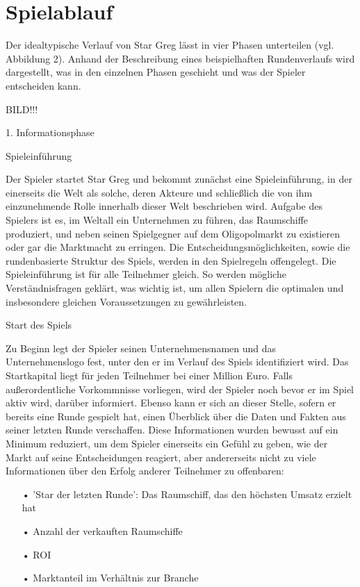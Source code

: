 \section{Spielablauf}
\label{sec:spielwelt-regeln}

Der idealtypische Verlauf von Star Greg lässt in vier Phasen unterteilen (vgl. Abbildung 2). Anhand der Beschreibung eines beispielhaften Rundenverlaufs wird dargestellt, was in den einzelnen Phasen geschieht und was der Spieler entscheiden kann.



BILD!!!



{\Large 1. Informationsphase}


{\large Spieleinführung}

Der Spieler startet Star Greg und bekommt zunächst eine Spieleinführung, in der einerseits die Welt als solche, deren Akteure und schließlich die von ihm einzunehmende Rolle innerhalb dieser Welt beschrieben wird. Aufgabe des Spielers ist es, im Weltall ein Unternehmen zu führen, das Raumschiffe produziert, und neben seinen Spielgegner auf dem Oligopolmarkt zu existieren oder gar die Marktmacht zu erringen. Die Entscheidungsmöglichkeiten, sowie die rundenbasierte Struktur des Spiels, werden in den Spielregeln offengelegt. Die Spieleinführung ist für alle Teilnehmer gleich. So werden mögliche Verständnisfragen geklärt, was wichtig ist, um allen Spielern die optimalen und insbesondere gleichen Voraussetzungen zu gewährleisten. 


{\large Start des Spiels}

Zu Beginn legt der Spieler seinen Unternehmensnamen und das Unternehmenslogo fest, unter den er im Verlauf des Spiels identifiziert wird. Das Startkapital liegt für jeden Teilnehmer bei einer Million Euro. Falls außerordentliche Vorkommnisse vorliegen, wird der Spieler noch bevor er im Spiel aktiv wird, darüber informiert. Ebenso kann er sich an dieser Stelle, sofern er bereits eine Runde gespielt hat, einen Überblick über die Daten und Fakten aus seiner letzten Runde verschaffen. Diese Informationen wurden bewusst auf ein Minimum reduziert, um dem Spieler einerseits ein Gefühl zu geben, wie der Markt auf seine Entscheidungen reagiert, aber andererseits nicht zu viele Informationen über den Erfolg anderer Teilnehmer zu offenbaren:

\begin{itemize}
\item[•] 'Star der letzten Runde': Das Raumschiff, das den höchsten Umsatz erzielt hat
\item[•] Anzahl der verkauften Raumschiffe
\item[•] ROI
\item[•] Marktanteil im Verhältnis zur Branche
\end{itemize}

